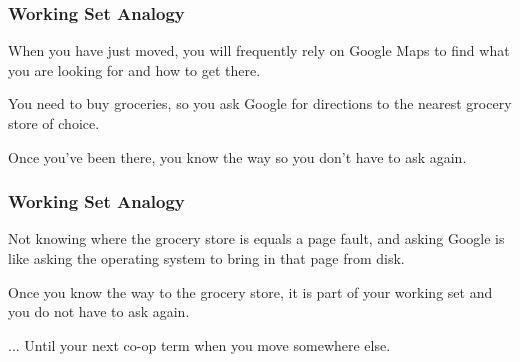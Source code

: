 \begin{frame}
\frametitle{Working Set Analogy}
When you have just moved, you will frequently rely on Google Maps to find what you are looking for and how to get there. 

You need to buy groceries, so you ask Google for directions to the nearest grocery store of choice. 

Once you've been there, you know the way so you don't have to ask again. 


\end{frame}

\begin{frame}
\frametitle{Working Set Analogy}

Not knowing where the grocery store is equals a page fault, and asking Google is like asking the operating system to bring in that page from disk. 

Once you know the way to the grocery store, it is part of your working set and you do not have to ask again.


... Until your next co-op term when you move somewhere else.

\end{frame}



